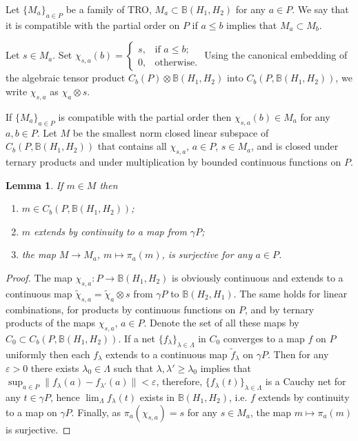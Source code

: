 \documentclass[12pt]{amsart}
\newtheorem{lem}[thm]{Lemma}
\theoremstyle{definition}
\newcommand{\til}{\widetilde}
\begin{document}
Let $\{M_a\}_{a\in P}$ be a family of TRO, $M_a\subset\mathbb B(H_1,H_2)$ for any $a\in P$. We say that it is compatible with the partial order on $P$ if $a\leq b$ implies that $M_a\subset M_b$.   

Let $s\in M_a$. Set $\chi_{s,a}(b)=\left\lbrace\begin{array}{cl}s,&\mbox{if\ }a\leq b;\\0,&\mbox{otherwise.}\end{array}\right.$ 
Using the canonical embedding of the algebraic tensor product $C_b(P)\otimes\mathbb B(H_1,H_2)$ into $C_b(P,\mathbb B(H_1,H_2))$, we write $\chi_{s,a}$ as $\chi_a\otimes s$.

If $\{M_a\}_{a\in P}$ is compatible with the partial order then $\chi_{s,a}(b)\in M_a$ for any $a,b\in P$. Let $M$ be the smallest norm closed linear subspace of $C_b(P,\mathbb B(H_1,H_2))$ that contains all $\chi_{s,a}$, $a\in P$, $s\in M_a$, and is closed under ternary products and under multiplication by bounded continuous functions on $P$.

\begin{lem}
If $m\in M$ then 
\begin{enumerate}
\item
$m\in C_b(P,\mathbb B(H_1,H_2))$;
\item
$m$ extends by continuity to a map from $\gamma P$;
\item
the map $M\to M_a$, $m\mapsto \pi_a(m)$, is surjective for any $a\in P$. 

\end{enumerate}

\end{lem}
\begin{proof}
The map $\chi_{s,a}:P\to\mathbb B(H_1,H_2)$ is obviously continuous and extends to a continuous map $\til\chi_{s,a}=\til\chi_a\otimes s$ from $\gamma P$ to $\mathbb B(H_2,H_1)$. The same holds for linear combinations, for products by continuous functions on $P$, and by ternary products of the maps $\chi_{s,a}$, $a\in P$. Denote the set of all these maps by $C_0\subset C_b(P,\mathbb B(H_1,H_2))$. If a net $\{f_\lambda\}_{\lambda\in\Lambda}$ in $C_0$ converges to a map $f$ on $P$ uniformly then each $f_\lambda$ extends to a continuous map $\tilde f_\lambda$ on $\gamma P$. Then for any $\varepsilon>0$ there exists $\lambda_0\in\Lambda$ such that $\lambda,\lambda'\geq\lambda_0$ implies that $\sup_{a\in P}\|f_\lambda(a)-f_{\lambda'}(a)\|<\varepsilon$, therefore, $\{f_\lambda(t)\}_{\lambda\in\Lambda}$ is a Cauchy net for any $t\in\gamma P$, hence $\lim_{\Lambda}f_\lambda(t)$ exists in $\mathbb B(H_1,H_2)$, i.e. $f$ extends by continuity to a map on $\gamma P$.   
Finally, as $\pi_a(\chi_{s,a})=s$ for any $s\in M_a$, the map $m\mapsto\pi_a(m)$ is surjective. 
\end{proof}
\end{document}
